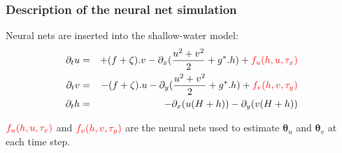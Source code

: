 \documentclass[handout]{beamer}
\newcommand{\btheta}{\mathbf{\theta}}
\begin{document}
\begin{frame}
\frametitle{Description of the neural net simulation}
Neural nets 
are inserted into the shallow-water model: 
\begin{eqnarray}
\partial_tu & = &
+ (f + \zeta ).v  - \partial_x (\frac{u^2+v^2}{2} + g^*.h) + \textcolor{red}{f_u(h,u,\tau_x)}\nonumber \\
\partial_tv & = &
-  (f + \zeta ).u  - \partial_y (\frac{u^2+v^2}{2} + g^*.h) + \textcolor{red}{f_v(h,v,\tau_y)}\nonumber \\
\partial_th & = &
- \partial_x(u(H+h)) - \partial_y(v(H+h)) \nonumber
\end{eqnarray}

$\textcolor{red}{f_u(h,u,\tau_x)}$ and $\textcolor{red}{f_v(h,v,\tau_y)}$ are the neural nets used to estimate $\btheta_u$ and $\btheta_v$
at each time step.
\end{frame}
\end{document}
